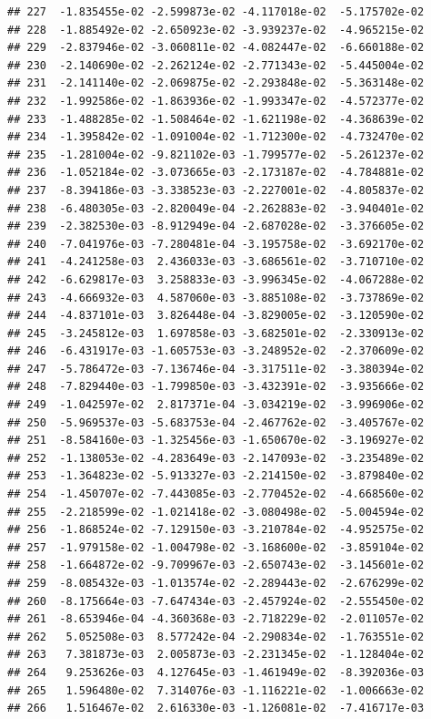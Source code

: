 \documentclass[
]{article}
\begin{document}
\begin{verbatim}
## 227  -1.835455e-02 -2.599873e-02 -4.117018e-02  -5.175702e-02
## 228  -1.885492e-02 -2.650923e-02 -3.939237e-02  -4.965215e-02
## 229  -2.837946e-02 -3.060811e-02 -4.082447e-02  -6.660188e-02
## 230  -2.140690e-02 -2.262124e-02 -2.771343e-02  -5.445004e-02
## 231  -2.141140e-02 -2.069875e-02 -2.293848e-02  -5.363148e-02
## 232  -1.992586e-02 -1.863936e-02 -1.993347e-02  -4.572377e-02
## 233  -1.488285e-02 -1.508464e-02 -1.621198e-02  -4.368639e-02
## 234  -1.395842e-02 -1.091004e-02 -1.712300e-02  -4.732470e-02
## 235  -1.281004e-02 -9.821102e-03 -1.799577e-02  -5.261237e-02
## 236  -1.052184e-02 -3.073665e-03 -2.173187e-02  -4.784881e-02
## 237  -8.394186e-03 -3.338523e-03 -2.227001e-02  -4.805837e-02
## 238  -6.480305e-03 -2.820049e-04 -2.262883e-02  -3.940401e-02
## 239  -2.382530e-03 -8.912949e-04 -2.687028e-02  -3.376605e-02
## 240  -7.041976e-03 -7.280481e-04 -3.195758e-02  -3.692170e-02
## 241  -4.241258e-03  2.436033e-03 -3.686561e-02  -3.710710e-02
## 242  -6.629817e-03  3.258833e-03 -3.996345e-02  -4.067288e-02
## 243  -4.666932e-03  4.587060e-03 -3.885108e-02  -3.737869e-02
## 244  -4.837101e-03  3.826448e-04 -3.829005e-02  -3.120590e-02
## 245  -3.245812e-03  1.697858e-03 -3.682501e-02  -2.330913e-02
## 246  -6.431917e-03 -1.605753e-03 -3.248952e-02  -2.370609e-02
## 247  -5.786472e-03 -7.136746e-04 -3.317511e-02  -3.380394e-02
## 248  -7.829440e-03 -1.799850e-03 -3.432391e-02  -3.935666e-02
## 249  -1.042597e-02  2.817371e-04 -3.034219e-02  -3.996906e-02
## 250  -5.969537e-03 -5.683753e-04 -2.467762e-02  -3.405767e-02
## 251  -8.584160e-03 -1.325456e-03 -1.650670e-02  -3.196927e-02
## 252  -1.138053e-02 -4.283649e-03 -2.147093e-02  -3.235489e-02
## 253  -1.364823e-02 -5.913327e-03 -2.214150e-02  -3.879840e-02
## 254  -1.450707e-02 -7.443085e-03 -2.770452e-02  -4.668560e-02
## 255  -2.218599e-02 -1.021418e-02 -3.080498e-02  -5.004594e-02
## 256  -1.868524e-02 -7.129150e-03 -3.210784e-02  -4.952575e-02
## 257  -1.979158e-02 -1.004798e-02 -3.168600e-02  -3.859104e-02
## 258  -1.664872e-02 -9.709967e-03 -2.650743e-02  -3.145601e-02
## 259  -8.085432e-03 -1.013574e-02 -2.289443e-02  -2.676299e-02
## 260  -8.175664e-03 -7.647434e-03 -2.457924e-02  -2.555450e-02
## 261  -8.653946e-04 -4.360368e-03 -2.718229e-02  -2.011057e-02
## 262   5.052508e-03  8.577242e-04 -2.290834e-02  -1.763551e-02
## 263   7.381873e-03  2.005873e-03 -2.231345e-02  -1.128404e-02
## 264   9.253626e-03  4.127645e-03 -1.461949e-02  -8.392036e-03
## 265   1.596480e-02  7.314076e-03 -1.116221e-02  -1.006663e-02
## 266   1.516467e-02  2.616330e-03 -1.126081e-02  -7.416717e-03

\end{verbatim}
\end{document}
